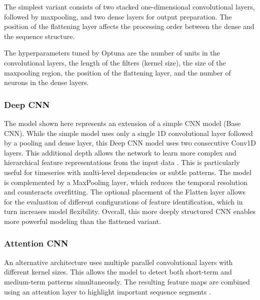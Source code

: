 The simplest variant consists of two stacked one-dimensional convolutional layers, followed by maxpooling, and two dense layers for output preparation.
The position of the flattening layer affects the processing order between the dense and the sequence structure.

The hyperparameters tuned by Optuna are the number of units in the convolutional layers, the length of the filters (kernel size), the size of the maxpooling region, the position of the flattening layer, and the number of neurons in the dense layers.



\subsubsection{Deep CNN}

The model shown here represents an extension of a simple CNN model (Base CNN).
While the simple model uses only a single 1D convolutional layer followed by a pooling and dense layer, this Deep CNN model uses two consecutive Conv1D layers.
This additional depth allows the network to learn more complex and hierarchical feature representations from the input data \cite{cnn-deep-more-complex}.
This is particularly useful for timeseries with multi-level dependencies or subtle patterns.
The model is complemented by a MaxPooling layer, which reduces the temporal resolution and counteracts overfitting.
The optional placement of the Flatten layer allows for the evaluation of different configurations of feature identification, which in turn increases model flexibility.
Overall, this more deeply structured CNN enables more powerful modeling than the flattened variant.



\subsubsection{Attention CNN}

An alternative architecture uses multiple parallel convolutional layers with different kernel sizes.
This allows the model to detect both short-term and medium-term patterns simultaneously.
The resulting feature maps are combined using an attention layer to highlight important sequence segments \cite{cnn-attention}.

